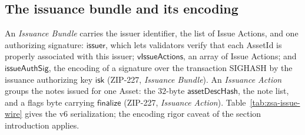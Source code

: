 \documentclass[11pt,a4paper]{article}
\theoremstyle{definition}
\begin{document}
\subsection{The issuance bundle and its encoding}%
\label{sec:zsa-issuance-wire}

An \emph{Issuance Bundle} carries the issuer identifier, the list of
Issue Actions, and one authorizing signature: $\mathsf{issuer}$, which
lets validators verify that each AssetId is properly associated with this
issuer; $\mathsf{vIssueActions}$, an array of Issue Actions; and
$\mathsf{issueAuthSig}$, the encoding of a signature over the transaction
SIGHASH by the issuance authorizing key $\mathsf{isk}$ (ZIP-227,
\emph{Issuance Bundle}). An \emph{Issuance Action} groups the notes
issued for one Asset: the $32$-byte $\mathsf{assetDescHash}$, the note
list, and a flags byte carrying $\mathsf{finalize}$ (ZIP-227,
\emph{Issuance Action}). Table~\ref{tab:zsa-issue-wire} gives the v6
serialization; the encoding rigor caveat of the section introduction
applies.
\end{document}
